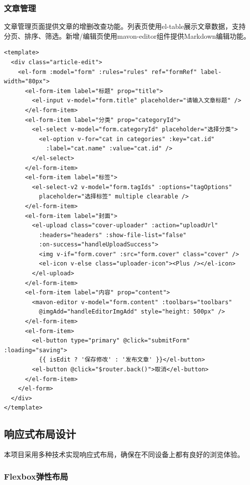 \documentclass[12pt,a4paper]{article}
\begin{document}
\subsubsection{文章管理}

文章管理页面提供文章的增删改查功能。列表页使用el-table展示文章数据，支持分页、排序、筛选。新增/编辑页使用mavon-editor组件提供Markdown编辑功能。

\begin{lstlisting}[language={}, basicstyle=\ttfamily\small, caption=文章编辑页代码]
<template>
  <div class="article-edit">
    <el-form :model="form" :rules="rules" ref="formRef" label-width="80px">
      <el-form-item label="标题" prop="title">
        <el-input v-model="form.title" placeholder="请输入文章标题" />
      </el-form-item>
      <el-form-item label="分类" prop="categoryId">
        <el-select v-model="form.categoryId" placeholder="选择分类">
          <el-option v-for="cat in categories" :key="cat.id"
            :label="cat.name" :value="cat.id" />
        </el-select>
      </el-form-item>
      <el-form-item label="标签">
        <el-select-v2 v-model="form.tagIds" :options="tagOptions"
          placeholder="选择标签" multiple clearable />
      </el-form-item>
      <el-form-item label="封面">
        <el-upload class="cover-uploader" :action="uploadUrl"
          :headers="headers" :show-file-list="false"
          :on-success="handleUploadSuccess">
          <img v-if="form.cover" :src="form.cover" class="cover" />
          <el-icon v-else class="uploader-icon"><Plus /></el-icon>
        </el-upload>
      </el-form-item>
      <el-form-item label="内容" prop="content">
        <mavon-editor v-model="form.content" :toolbars="toolbars"
          @imgAdd="handleEditorImgAdd" style="height: 500px" />
      </el-form-item>
      <el-form-item>
        <el-button type="primary" @click="submitForm" :loading="saving">
          {{ isEdit ? '保存修改' : '发布文章' }}</el-button>
        <el-button @click="$router.back()">取消</el-button>
      </el-form-item>
    </el-form>
  </div>
</template>
\end{lstlisting}

\subsection{响应式布局设计}

本项目采用多种技术实现响应式布局，确保在不同设备上都有良好的浏览体验。

\subsubsection{Flexbox弹性布局}
\end{document}
